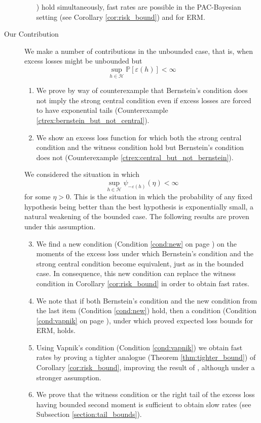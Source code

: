 \documentclass{uvamath}
\newcommand*{\calH}{\mathcal{H}}
\newcommand*{\bbP}{\mathbb{P}}
\theoremstyle{remark}
\theoremstyle{definition}
\theoremstyle{definition}
\theoremstyle{definition}
\theoremstyle{definition}
\theoremstyle{definition}
\begin{document}
\begin{description}
\begin{enumerate}
    \pageref{cond:witness}) hold simultaneously, fast rates are
    possible in the PAC-Bayesian setting (see Corollary
    \ref{cor:risk_bound}) and for ERM.
  \end{enumerate}
\item[Our Contribution] We make a number of contributions in the
  unbounded case, that is, when excess losses might be unbounded
  but $$\sup_{h\in\calH}\bbP[\varepsilon(h)]<\infty$$
  \begin{enumerate}
  \item We prove by way of counterexample that Bernstein's condition
    does not imply the strong central condition even if excess losses
    are forced to have exponential tails (Counterexample
    \ref{ctrex:bernstein_but_not_central}).
  \item We show an excess loss function for which both the strong
    central condition and the witness condition hold but Bernstein's
    condition does not (Counterexample
    \ref{ctrex:central_but_not_bernstein}).
  \end{enumerate}
  We considered the situation in which
  \begin{equation}\label{eq:bounded_cumulant_2}
    \sup_{h\in\calH}\psi_{-\varepsilon(h)}(\eta)<\infty
  \end{equation}
  for some $\eta>0$. This is the situation in which the probability of
  any fixed hypothesis being better than the best hypothesis is
  exponentially small, a natural weakening of the bounded case.  The
  following results are proven under this assumption.
  \begin{enumerate}
    \setcounter{enumi}{2}
  \item We find a new condition (Condition \ref{cond:new} on page
    \pageref{cond:new}) on the moments of the excess loss under
    which Bernstein's condition and the strong central condition
    become equivalent, just as in the bounded case. In
    consequence, this new condition can replace the witness
    condition in Corollary \ref{cor:risk_bound} in order to obtain
    fast rates.
  \item We note that if both Bernstein's condition and the new
    condition from the last item (Condition \ref{cond:new}) hold, then
    a condition (Condition \ref{cond:vapnik} on page
    \pageref{cond:vapnik}), under which
    \citet{vapnik_statistical_1998} proved expected loss bounds for
    ERM, holds.
  \item Using Vapnik's condition (Condition \ref{cond:vapnik}) we
    obtain fast rates by proving a tighter analogue (Theorem
    \ref{thm:tighter_bound}) of Corollary \ref{cor:risk_bound},
    improving the result of \citet{grunwald_fast_2016}, although under
    a stronger assumption.
  \item We prove that the witness condition or the right tail of the
    excess loss having bounded second moment is sufficient to obtain
    slow rates (see Subsection \ref{section:tail_bounds}).
  \end{enumerate}
\end{description}
\end{document}
